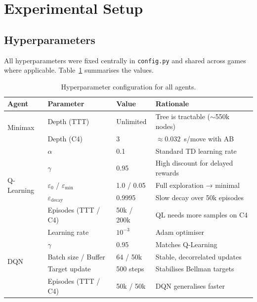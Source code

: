 \documentclass[11pt,a4paper]{article}
\begin{document}
\section{Experimental Setup}
\label{sec:setup}

\subsection{Hyperparameters}

All hyperparameters were fixed centrally in \texttt{config.py} and shared across games where applicable.
Table~\ref{tab:hyperparams} summarises the values.

\begin{table}[H]
\centering
\caption{Hyperparameter configuration for all agents.}
\label{tab:hyperparams}
\begin{tabular}{llll}
\toprule
Agent & Parameter & Value & Rationale \\
\midrule
\multirow{2}{*}{Minimax} & Depth (TTT) & Unlimited & Tree is tractable ($\sim$550k nodes) \\
                          & Depth (C4)  & 3         & $\approx 0.032$~s/move with AB \\
\midrule
\multirow{5}{*}{Q-Learning} & $\alpha$ & 0.1    & Standard TD learning rate \\
                             & $\gamma$ & 0.95   & High discount for delayed rewards \\
                             & $\varepsilon_0$ / $\varepsilon_{\min}$ & 1.0 / 0.05 & Full exploration → minimal \\
                             & $\varepsilon_{\text{decay}}$ & 0.9995 & Slow decay over 50k episodes \\
                             & Episodes (TTT / C4) & 50k / 200k & QL needs more samples on C4 \\
\midrule
\multirow{5}{*}{DQN} & Learning rate & $10^{-3}$ & Adam optimiser \\
                     & $\gamma$ & 0.95 & Matches Q-Learning \\
                     & Batch size / Buffer & 64 / 50k & Stable, decorrelated updates \\
                     & Target update & 500 steps & Stabilises Bellman targets \\
                     & Episodes (TTT / C4) & 50k / 50k & DQN generalises faster \\
\bottomrule
\end{tabular}
\end{table}
\end{document}

